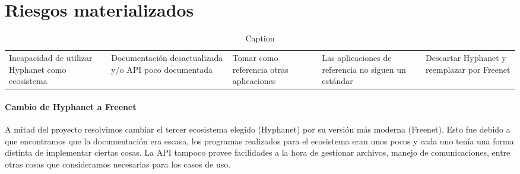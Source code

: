 \section{Riesgos materializados}



\renewcommand\theadfont{\bfseries}

\begin{table}[!htbp]
    \centering
    \begin{tabular}{*{5}{|p{70pt}}|}
         \hline
          &  &  &  &  \\
         \hline
         Incapacidad de utilizar Hyphanet como ecosistema & Documentación desactualizada y/o API poco documentada & Tomar como referencia otras aplicaciones & Las aplicaciones de referencia no siguen un estándar & Descartar Hyphanet y reemplazar por Freenet \\
         \hline
    \end{tabular}
    \caption{Caption}
    \label{tab:my_label}
\end{table}

\paragraph{Cambio de Hyphanet a Freenet}
A mitad del proyecto resolvimos cambiar el tercer ecosistema elegido (Hyphanet) por su versión más moderna (Freenet). Esto fue debido a que encontramos que la documentación era escasa, los programas realizados para el ecosistema eran unos pocos y cada uno tenía una forma distinta de implementar ciertas cosas. La API tampoco provee facilidades a la hora de gestionar archivos, manejo de comunicaciones, entre otras cosas que consideramos necesarias para los casos de uso.

